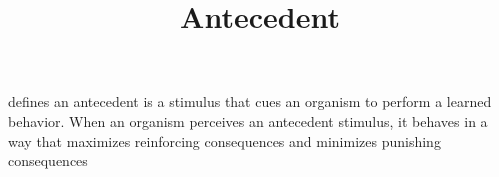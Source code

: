 \documentclass[a4paper]{article}
\title{Antecedent}
\date{}
\begin{document}
\maketitle
     defines an antecedent is a stimulus that cues an organism to perform a learned behavior. When an organism perceives an antecedent stimulus, it behaves in a way that maximizes reinforcing consequences and minimizes punishing consequences
\end{document}
